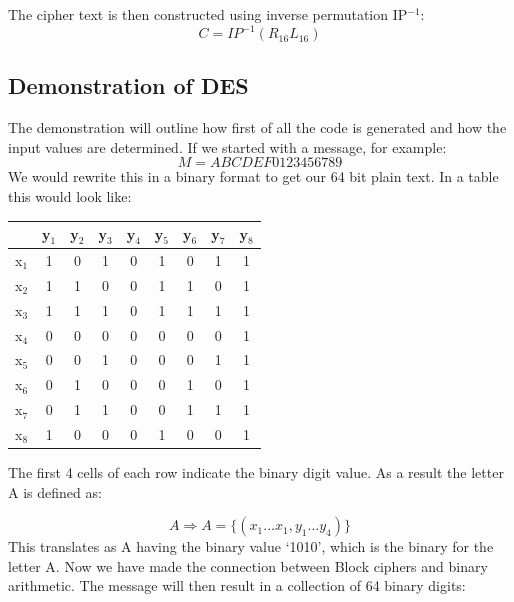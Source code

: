 \documentclass[11pt,a4paper]{report}
\begin{document}
The cipher text is then constructed using inverse permutation IP$^{-1}$:
\begin{displaymath}
C = IP^{-1}(R_{16}L_{16})
\end{displaymath}

\subsection{Demonstration of DES}
\label{subsec: DemoDES}

The demonstration will outline how first of all the code is generated and how the input values are determined. If we started with a message, for example:
\begin{displaymath}
M = ABCDEF0123456789
\end{displaymath}
We would rewrite this in a binary format to get our 64 bit plain text. In a table this would look like:

\begin{center}
\begin{tabular}{ |c|c|c|c|c|c|c|c|c| }
\hline
  {} & y$_{1}$ & y$_{2}$ & y$_{3}$ & y$_{4}$ & y$_{5}$ & y$_{6}$ & y$_{7}$ & y$_{8}$ \\ \hline
  x$_{1}$ & 1 & 0 & 1 & 0 & 1 & 0 & 1 & 1 \\ \hline
  x$_{2}$ & 1 & 1 & 0 & 0 & 1 & 1 & 0 & 1 \\ \hline
  x$_{3}$ & 1 & 1 & 1 & 0 & 1 & 1 & 1 & 1 \\ \hline
  x$_{4}$ & 0 & 0 & 0 & 0 & 0 & 0 & 0 & 1 \\ \hline
  x$_{5}$ & 0 & 0 & 1 & 0 & 0 & 0 & 1 & 1 \\ \hline
  x$_{6}$ & 0 & 1 & 0 & 0 & 0 & 1 & 0 & 1 \\ \hline
  x$_{7}$ & 0 & 1 & 1 & 0 & 0 & 1 & 1 & 1 \\ \hline
  x$_{8}$ & 1 & 0 & 0 & 0 & 1 & 0 & 0 & 1 \\ \hline
\end{tabular}
\end{center}

The first 4 cells of each row indicate the binary digit value. As a result the letter A is defined as:

\begin{displaymath}
A \Rightarrow A = \{(x_{1}...x_{1}, y_{1}...y_{4})\}
\end{displaymath}
This translates as A having the binary value `1010', which is the binary for the letter A. Now we have made the connection between Block ciphers and binary arithmetic. The message will then result in a collection of 64 binary digits:
\end{document}

